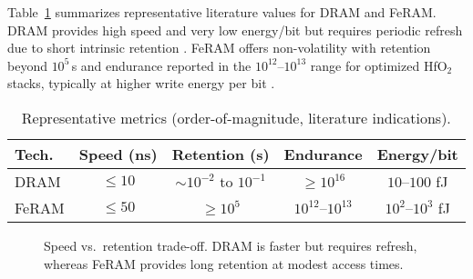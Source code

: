 \label{sec:comparison}

Table~\ref{tab:comparison} summarizes representative literature values for DRAM and FeRAM. DRAM provides high speed and very low energy/bit but requires periodic refresh due to short intrinsic retention \cite{choi2022,kim2021_dram,iedm2023_dram}. FeRAM offers non-volatility with retention beyond $10^{5}$\,s and endurance reported in the $10^{12}$--$10^{13}$ range for optimized HfO$_2$ stacks, typically at higher write energy per bit \cite{boscke2011,mueller2012,noheda2023,martin2020}.

\begin{table}[!t]
\centering
\caption{Representative metrics (order-of-magnitude, literature indications).}
\label{tab:comparison}
\scriptsize
\begin{tabular}{lcccc}
\toprule
Tech. & Speed (ns) & Retention (s) & Endurance & Energy/bit \\
\midrule
DRAM  & $\le 10$  & $\sim 10^{-2}$ to $10^{-1}$ & $\ge 10^{16}$ & $10$--$100$ fJ \\
FeRAM & $\le 50$  & $\ge 10^{5}$                & $10^{12}$--$10^{13}$ & $10^{2}$--$10^{3}$ fJ \\
\bottomrule
\end{tabular}
\end{table}

\begin{figure}[!t]
\centering
{}
\caption{Speed vs.\ retention trade-off. DRAM is faster but requires refresh, whereas FeRAM provides long retention at modest access times.}
\label{fig:speed_retention}
\end{figure}

